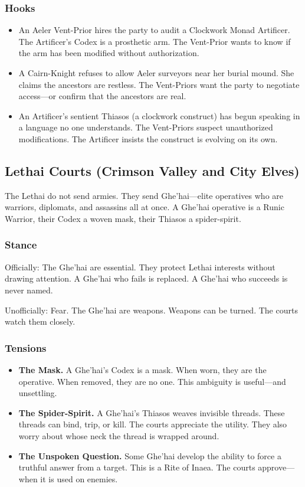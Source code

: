 \subsubsection{Hooks}

\begin{itemize}
\item An Aeler Vent-Prior hires the party to audit a Clockwork Monad Artificer. The Artificer's Codex is a prosthetic arm. The Vent-Prior wants to know if the arm has been modified without authorization.
\item A Cairn-Knight refuses to allow Aeler surveyors near her burial mound. She claims the ancestors are restless. The Vent-Priors want the party to negotiate access—or confirm that the ancestors are real.
\item An Artificer's sentient Thiasos (a clockwork construct) has begun speaking in a language no one understands. The Vent-Priors suspect unauthorized modifications. The Artificer insists the construct is evolving on its own.
\end{itemize}

\subsection{Lethai Courts (Crimson Valley and City Elves)}

The Lethai do not send armies. They send Ghe'hai—elite operatives who are warriors, diplomats, and assassins all at once. A Ghe'hai operative is a Runic Warrior, their Codex a woven mask, their Thiasos a spider-spirit.

\subsubsection{Stance}

Officially: The Ghe'hai are essential. They protect Lethai interests without drawing attention. A Ghe'hai who fails is replaced. A Ghe'hai who succeeds is never named.

Unofficially: Fear. The Ghe'hai are weapons. Weapons can be turned. The courts watch them closely.

\subsubsection{Tensions}

\begin{itemize}
\item \textbf{The Mask.} A Ghe'hai's Codex is a mask. When worn, they are the operative. When removed, they are no one. This ambiguity is useful—and unsettling.
\item \textbf{The Spider-Spirit.} A Ghe'hai's Thiasos weaves invisible threads. These threads can bind, trip, or kill. The courts appreciate the utility. They also worry about whose neck the thread is wrapped around.
\item \textbf{The Unspoken Question.} Some Ghe'hai develop the ability to force a truthful answer from a target. This is a Rite of Inaea. The courts approve—when it is used on enemies.
\end{itemize}


